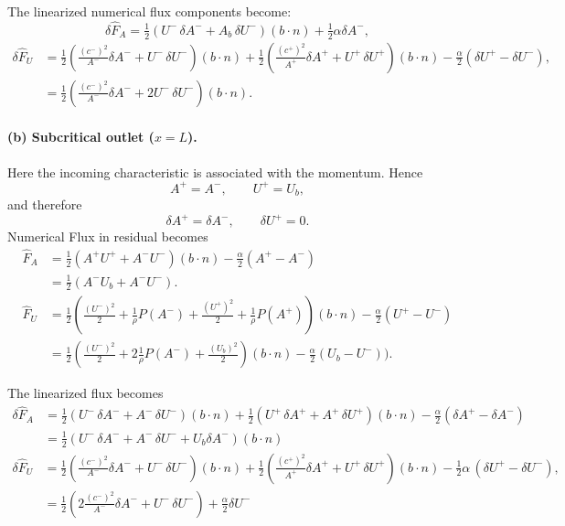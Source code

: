 \documentclass[11pt]{article}
\begin{document}
The linearized numerical flux components become:
\[
\delta\widehat{F}_A
=
\tfrac12\left(U^-\,\delta A^- +A_b\,\delta U^-\right)(b \cdot n)
+ \tfrac12\alpha\delta A^-,
\]
\begin{align*}
\delta\widehat{F}_U
& =
\tfrac12\left(\frac{(c^-)^2}{A^-}\delta A^- + U^-\,\delta U^-\right)(b \cdot n) + \tfrac12\left(\frac{(c^+)^2}{A^+}\delta A^+ + U^+\,\delta U^+\right)(b \cdot n) - \tfrac\alpha2(\delta U^{+} - \delta U^{-}), \\
& = \tfrac12\left(\frac{(c^-)^2}{A^-}\delta A^- + 2 U^-\,\delta U^-\right)(b \cdot n).
\end{align*}

\paragraph{(b) Subcritical outlet ($x=L$).}
Here the incoming characteristic is associated with the momentum.
Hence
\[
  A^+ = A^-, \qquad U^+ = U_b,
\]
and therefore
\[
  \delta A^+ = \delta A^-, \qquad
  \delta U^+ = 0.
\]
Numerical Flux in residual becomes 
\begin{align*}
 \widehat{F}_A &= \tfrac{1}{2} (A^{+} U^{+}  + A^{-}U^{-})(b \cdot n) - \tfrac{\alpha}{2}(A^{+} - A^{-})\\
 & = \frac{1}{2}(A^{-} U_b + A^{-}U^{-}) .\\
\widehat{F}_U &= \tfrac{1}{2} \left(\frac{(U^-)^2}{2} + \frac{1}{\rho}P(A^-) + \frac{(U^+)^2}{2} + \frac{1}{\rho}P(A^+)\right)(b \cdot n) -\tfrac{\alpha}{2}(U^+ - U^-) \\
& = \frac{1}{2}\left( \frac{(U^-)^2}{2} +2 \frac{1}{\rho} P(A^-) + \frac{(U_b)^2}{2}\right) (b\cdot n) - \tfrac{\alpha}{2}(U_b -U^{-})).
\end{align*}

The linearized flux becomes
\begin{align*}
\delta\widehat{F}_A
&=
\tfrac12\left(U^-\,\delta A^- + A^-\,\delta U^-\right)(b \cdot n) + \tfrac12\left(U^+\,\delta A^+ + A^+\,\delta U^+\right)(b \cdot n) - \tfrac\alpha2 ( \delta A^+ - \delta A^{-})\\
& = \tfrac{1}{2}\left( U^-\,\delta A^- + A^-\,\delta U^- + U_b \delta A^-\right)(b\cdot n)
\end{align*}
\begin{align*}
\delta\widehat{F}_U
&=
\tfrac12\left(\frac{(c^{-})^2}{A^-}\delta A^- + U^-\,\delta U^-\right)(b \cdot n)+\tfrac12\left(\frac{(c^{+})^2}{A^+}\delta A^+ + U^+\,\delta U^+\right)(b \cdot n)
- \tfrac12\alpha\,(\delta U^+ - \delta U^{-}) ,\\
& = \tfrac12\left( 2 \frac{(c^{-})^2}{A^-}\delta A^- +  U^-\,\delta U^-\right) + \tfrac{\alpha}{2}\delta U^{-}
\end{align*}
\end{document}
